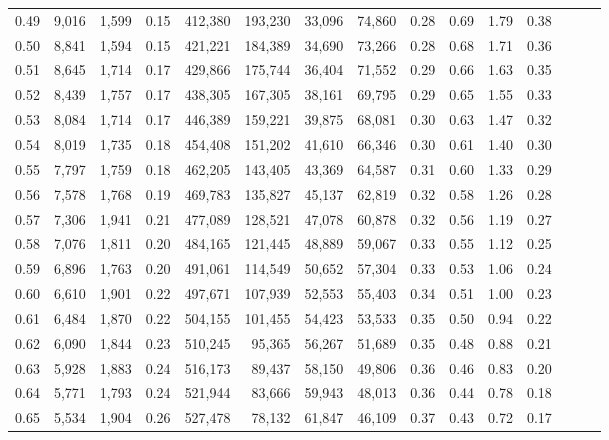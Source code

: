 \begin{tabular}{rrrrrrrrrrrrrrr}
0.49 &   9,016 &  1,599 &  0.15 &  412,380 &  193,230 &   33,096 &   74,860 &  0.28 &  0.69 &  1.79 &      0.38 \\
0.50 &   8,841 &  1,594 &  0.15 &  421,221 &  184,389 &   34,690 &   73,266 &  0.28 &  0.68 &  1.71 &      0.36 \\
0.51 &   8,645 &  1,714 &  0.17 &  429,866 &  175,744 &   36,404 &   71,552 &  0.29 &  0.66 &  1.63 &      0.35 \\
0.52 &   8,439 &  1,757 &  0.17 &  438,305 &  167,305 &   38,161 &   69,795 &  0.29 &  0.65 &  1.55 &      0.33 \\
0.53 &   8,084 &  1,714 &  0.17 &  446,389 &  159,221 &   39,875 &   68,081 &  0.30 &  0.63 &  1.47 &      0.32 \\
0.54 &   8,019 &  1,735 &  0.18 &  454,408 &  151,202 &   41,610 &   66,346 &  0.30 &  0.61 &  1.40 &      0.30 \\
0.55 &   7,797 &  1,759 &  0.18 &  462,205 &  143,405 &   43,369 &   64,587 &  0.31 &  0.60 &  1.33 &      0.29 \\
0.56 &   7,578 &  1,768 &  0.19 &  469,783 &  135,827 &   45,137 &   62,819 &  0.32 &  0.58 &  1.26 &      0.28 \\
0.57 &   7,306 &  1,941 &  0.21 &  477,089 &  128,521 &   47,078 &   60,878 &  0.32 &  0.56 &  1.19 &      0.27 \\
0.58 &   7,076 &  1,811 &  0.20 &  484,165 &  121,445 &   48,889 &   59,067 &  0.33 &  0.55 &  1.12 &      0.25 \\
0.59 &   6,896 &  1,763 &  0.20 &  491,061 &  114,549 &   50,652 &   57,304 &  0.33 &  0.53 &  1.06 &      0.24 \\
0.60 &   6,610 &  1,901 &  0.22 &  497,671 &  107,939 &   52,553 &   55,403 &  0.34 &  0.51 &  1.00 &      0.23 \\
0.61 &   6,484 &  1,870 &  0.22 &  504,155 &  101,455 &   54,423 &   53,533 &  0.35 &  0.50 &  0.94 &      0.22 \\
0.62 &   6,090 &  1,844 &  0.23 &  510,245 &   95,365 &   56,267 &   51,689 &  0.35 &  0.48 &  0.88 &      0.21 \\
0.63 &   5,928 &  1,883 &  0.24 &  516,173 &   89,437 &   58,150 &   49,806 &  0.36 &  0.46 &  0.83 &      0.20 \\
0.64 &   5,771 &  1,793 &  0.24 &  521,944 &   83,666 &   59,943 &   48,013 &  0.36 &  0.44 &  0.78 &      0.18 \\
0.65 &   5,534 &  1,904 &  0.26 &  527,478 &   78,132 &   61,847 &   46,109 &  0.37 &  0.43 &  0.72 &      0.17 \\

\end{tabular}
